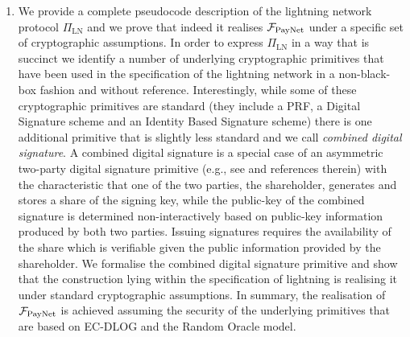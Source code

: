 \begin{enumerate}
\item We provide a complete pseudocode description  of the lightning network protocol $\Pi_{\mathrm{LN}}$
and we prove that indeed it 
realises  $\mathcal{F}_{\mathrm{PayNet}}{}$ under a specific set of cryptographic 
assumptions. In order to express $\Pi_{\mathrm{LN}}$ in a way that is succinct we identify a number of underlying cryptographic primitives that have been used in the specification of the lightning network in a non-black-box fashion and without reference.  Interestingly, while some of these cryptographic primitives are standard (they include a PRF, a Digital Signature scheme and an Identity Based Signature scheme) there is one additional primitive that is slightly less standard and we call  {\em combined digital signature}. A combined digital signature is a special case of an asymmetric  two-party digital signature primitive (e.g., see \cite{DBLP:conf/ndss/NicolosiKDM03} and references therein) with the characteristic that one of the two parties, the shareholder, generates and stores a share of the signing key, while the public-key of the combined signature is determined non-interactively based on public-key information produced by both two parties.  Issuing signatures requires the availability of the share which is verifiable given the public information provided by the shareholder.   We formalise the combined digital signature primitive and show that the construction lying within the specification of lightning is realising it under standard cryptographic assumptions. In summary, the realisation of  $\mathcal{F}_{\mathrm{PayNet}}{}$ is achieved assuming the security of the underlying primitives that are based on EC-DLOG and the Random Oracle model. 
\end{enumerate}

